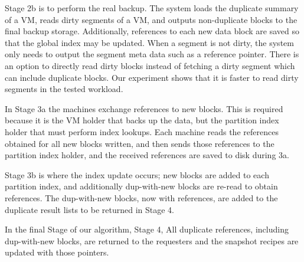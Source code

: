 Stage 2b is to perform the real backup.
The system loads the duplicate summary of a VM, 
reads  dirty segments of a VM, and outputs non-duplicate blocks to the final backup 
storage. Additionally, references to each new data block are saved so that the
global index may be updated.%
When a segment is not dirty, the system only needs to output the segment meta data such as a reference pointer. 
There is an option to directly read dirty blocks instead of fetching a dirty segment which can include duplicate
blocks. Our experiment shows that it is faster to read dirty segments in the tested workload.



In Stage 3a the machines exchange references to new blocks. This is required
because it is the VM holder that backs up the data, but the partition index
holder that must perform index lookups. Each machine reads the references
obtained for all new blocks written, and then sends those references to the
partition index holder, and the received references are saved to disk during 3a.

Stage 3b is where the index update occurs; new blocks are added to each
partition index, and additionally dup-with-new blocks are re-read to obtain
references. The dup-with-new blocks, now with references, are added to the
duplicate result lists to be returned in Stage 4.

In the final Stage of our algorithm, Stage 4, All duplicate references,
including dup-with-new blocks, are returned to the requesters and the snapshot
recipes are updated with those pointers.


